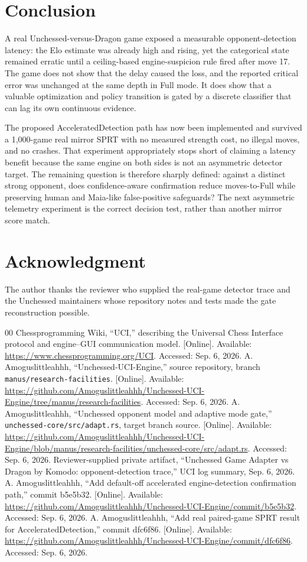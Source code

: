 \documentclass[conference]{IEEEtran}
\begin{document}
\section{Conclusion}
A real Unchessed-versus-Dragon game exposed a measurable opponent-detection latency: the Elo estimate was already high and rising, yet the categorical state remained erratic until a ceiling-based engine-suspicion rule fired after move 17. The game does not show that the delay caused the loss, and the reported critical error was unchanged at the same depth in Full mode. It does show that a valuable optimization and policy transition is gated by a discrete classifier that can lag its own continuous evidence.

The proposed AcceleratedDetection path has now been implemented and survived a 1,000-game real mirror SPRT with no measured strength cost, no illegal moves, and no crashes. That experiment appropriately stops short of claiming a latency benefit because the same engine on both sides is not an asymmetric detector target. The remaining question is therefore sharply defined: against a distinct strong opponent, does confidence-aware confirmation reduce moves-to-Full while preserving human and Maia-like false-positive safeguards? The next asymmetric telemetry experiment is the correct decision test, rather than another mirror score match.

\section*{Acknowledgment}
The author thanks the reviewer who supplied the real-game detector trace and the Unchessed maintainers whose repository notes and tests made the gate reconstruction possible.

\begin{thebibliography}{00}
 Chessprogramming Wiki, ``UCI,'' describing the Universal Chess Interface protocol and engine--GUI communication model. [Online]. Available: \url{https://www.chessprogramming.org/UCI}. Accessed: Sep. 6, 2026.
 A. Amoguslittleahhh, ``Unchessed-UCI-Engine,'' source repository, branch \texttt{manus/research-facilities}. [Online]. Available: \url{https://github.com/Amoguslittleahhh/Unchessed-UCI-Engine/tree/manus/research-facilities}. Accessed: Sep. 6, 2026.
 A. Amoguslittleahhh, ``Unchessed opponent model and adaptive mode gate,'' \texttt{unchessed-core/src/adapt.rs}, target branch source. [Online]. Available: \url{https://github.com/Amoguslittleahhh/Unchessed-UCI-Engine/blob/manus/research-facilities/unchessed-core/src/adapt.rs}. Accessed: Sep. 6, 2026.
 Reviewer-supplied private artifact, ``Unchessed Game Adapter vs Dragon by Komodo: opponent-detection trace,'' UCI log summary, Sep. 6, 2026.
 A. Amoguslittleahhh, ``Add default-off accelerated engine-detection confirmation path,'' commit b5e5b32. [Online]. Available: \url{https://github.com/Amoguslittleahhh/Unchessed-UCI-Engine/commit/b5e5b32}. Accessed: Sep. 6, 2026.
 A. Amoguslittleahhh, ``Add real paired-game SPRT result for AcceleratedDetection,'' commit dfc6f86. [Online]. Available: \url{https://github.com/Amoguslittleahhh/Unchessed-UCI-Engine/commit/dfc6f86}. Accessed: Sep. 6, 2026.
\end{thebibliography}
\end{document}
